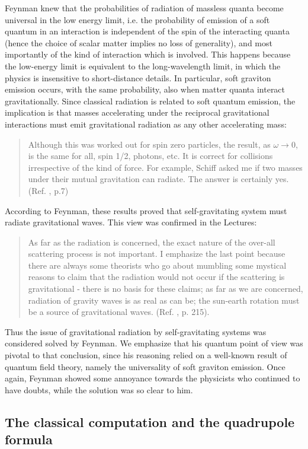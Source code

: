 \documentclass{ws-procs961x669}            %
\begin{document}
Feynman knew that the probabilities of radiation of massless
quanta become universal in the low energy limit, i.e. the
probability of emission of a soft quantum in an interaction is
independent of the spin of the interacting quanta (hence the
choice of scalar matter implies no loss of generality), and most
importantly of the kind of interaction which is involved. This
happens because the low-energy limit is equivalent to the
long-wavelength limit, in which the physics is insensitive to
short-distance details. In particular, soft graviton emission
occurs, with the same probability, also when matter quanta
interact gravitationally. Since classical radiation is related to
soft quantum emission, the implication is that masses accelerating
under the reciprocal gravitational interactions must emit
gravitational radiation as any other accelerating mass:
%
\begin{quote}
Although this was worked out for spin zero particles, the result,
as $\omega\rightarrow 0$, is the same for all, spin 1/2, photons,
etc. It is correct for collisions irrespective of the kind of
force. For example, Schiff asked me if two masses under their
mutual gravitation can radiate. The answer is certainly yes. (Ref.
, p.7)
\end{quote}
%
According to Feynman, these results proved that self-gravitating
system must radiate gravitational waves. This view was confirmed
in the Lectures:
%
\begin{quote}
As far as the radiation is concerned, the exact nature of the
over-all scattering process is not important. I emphasize the last
point because there are always some theorists who go about
mumbling some mystical reasons to claim that the radiation would
not occur if the scattering is gravitational - there is no basis
for these claims; as far as we are concerned, radiation of gravity
waves is as real as can be; the sun-earth rotation must be a
source of gravitational waves. (Ref. , p.
215).
\end{quote}
%
Thus the issue of gravitational radiation by self-gravitating
systems was considered solved by Feynman. We emphasize that his
quantum point of view was pivotal to that conclusion, since his
reasoning relied on a well-known result of quantum field theory,
namely the universality of soft graviton emission. Once again,
Feynman showed some annoyance towards the physicists who continued
to have doubts, while the solution was so clear to him.

\subsection{The classical computation and the quadrupole formula}
\end{document}
